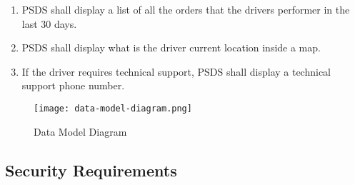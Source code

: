 \pagebreak
\begin{enumerate}[resume, label=SY-\arabic*]
    \item  PSDS shall display a list of all the orders that the drivers 
    performer in the last 30 days.
    \item  PSDS shall display what is the driver current location inside a map.
    \item  If the driver requires technical support, PSDS shall display a 
    technical support phone number.
\end{enumerate}

\begin{figure}[!htb]
    \centering
    \texttt{[image: data-model-diagram.png]}
    \caption{Data Model Diagram}
\end{figure}
\pagebreak
\subsection{Security Requirements}
